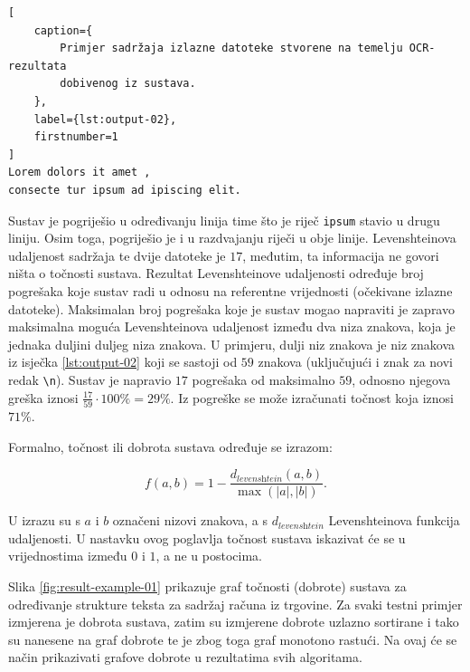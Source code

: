 \documentclass[times, utf8, zavrsni]{fer}
\begin{document}
\begin{lstlisting}[
    caption={
        Primjer sadržaja izlazne datoteke stvorene na temelju OCR-rezultata
        dobivenog iz sustava.
    },
    label={lst:output-02},
    firstnumber=1
]
Lorem dolors it amet ,
consecte tur ipsum ad ipiscing elit.
\end{lstlisting}

Sustav je pogriješio u određivanju linija time što je riječ \lstinline{ipsum}
stavio u drugu liniju. Osim toga, pogriješio je i u razdvajanju riječi u obje
linije. Levenshteinova udaljenost sadržaja te dvije datoteke je $17$, međutim,
ta informacija ne govori ništa o točnosti sustava. Rezultat Levenshteinove
udaljenosti određuje broj pogrešaka koje sustav radi u odnosu na referentne
vrijednosti (očekivane izlazne datoteke). Maksimalan broj pogrešaka koje je
sustav mogao napraviti je zapravo maksimalna moguća Levenshteinova udaljenost
između dva niza znakova, koja je jednaka duljini duljeg niza znakova. U
primjeru, dulji niz znakova je niz znakova iz isječka
\ref{lst:output-02} koji se sastoji od $59$ znakova (uključujući i znak za novi
redak \lstinline{\n}). Sustav je napravio $17$ pogrešaka od maksimalno $59$,
odnosno njegova greška iznosi $\frac{17}{59} \cdot 100\% = 29\%$. Iz pogreške
se može izračunati točnost koja iznosi $71\%$.

Formalno, točnost ili dobrota  sustava određuje se izrazom:

\begin{equation}
\label{eq:fitness}
f(a, b) = 1 - \frac{d_\textit{levenshtein}(a, b)}{\max(|a|, |b|)} \texttt{.}
\end{equation}

U izrazu su s $a$ i $b$ označeni nizovi znakova, a s
$d_\textit{levenshtein}$ Levenshteinova funkcija udaljenosti. U nastavku ovog
poglavlja točnost sustava iskazivat će se u vrijednostima
između $0$ i $1$, a ne u postocima.

Slika \ref{fig:result-example-01} prikazuje graf točnosti (dobrote) sustava za
određivanje strukture teksta za sadržaj računa iz trgovine. Za svaki testni
primjer izmjerena je dobrota sustava, zatim su izmjerene dobrote uzlazno
sortirane i tako su nanesene na graf dobrote te je zbog toga graf monotono
rastući. Na ovaj će se način prikazivati grafove dobrote u rezultatima svih
algoritama.
\end{document}
